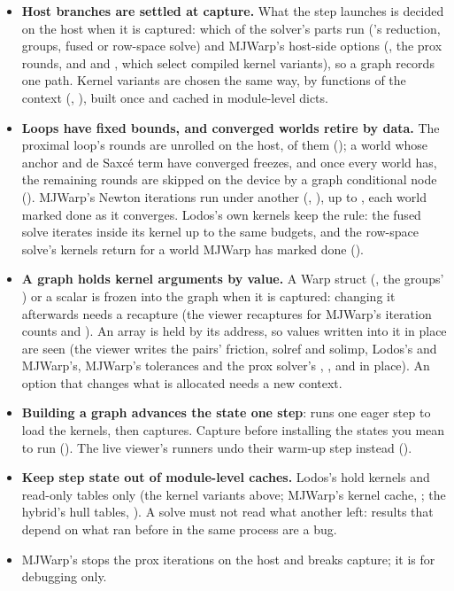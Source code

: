 \begin{itemize}
\item \textbf{Host branches are settled at capture.} What the step launches is decided on the host when it is captured: which of the solver's parts run ('s reduction, groups, fused or row-space solve) and MJWarp's host-side options (, the prox rounds, and  and , which select compiled kernel variants), so a graph records one path. Kernel variants are chosen the same way, by functions of the context (, ), built once and cached in module-level dicts.
\item \textbf{Loops have fixed bounds, and converged worlds retire by data.} The proximal loop's rounds are unrolled on the host,  of them (); a world whose anchor and de Saxc\'e term have converged freezes, and once every world has, the remaining rounds are skipped on the device by a graph conditional node (). MJWarp's Newton iterations run under another (, ), up to , each world marked done as it converges. Lodos's own kernels keep the rule: the fused solve iterates inside its kernel up to the same budgets, and the row-space solve's kernels return for a world MJWarp has marked done ().
\item \textbf{A graph holds kernel arguments by value.} A Warp struct (, the groups' ) or a scalar is frozen into the graph when it is captured: changing it afterwards needs a recapture (the viewer recaptures for MJWarp's iteration counts and ). An array is held by its address, so values written into it in place are seen (the viewer writes the pairs' friction, solref and solimp, Lodos's and MJWarp's, MJWarp's tolerances and the prox solver's , ,  and  in place). An option that changes what is allocated needs a new context.
\item \textbf{Building a graph advances the state one step}:  runs one eager step to load the kernels, then captures. Capture before installing the states you mean to run (). The live viewer's runners undo their warm-up step instead ().
\item \textbf{Keep step state out of module-level caches.} Lodos's hold kernels and read-only tables only (the kernel variants above; MJWarp's kernel cache, ; the hybrid's hull tables, ). A solve must not read what another  left: results that depend on what ran before in the same process are a bug.
\item MJWarp's  stops the prox iterations on the host and breaks capture; it is for debugging only.
\end{itemize}


